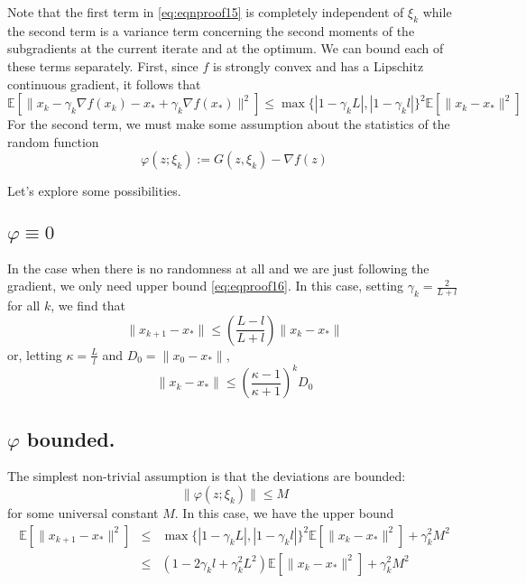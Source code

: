 Note that the first term in \eqref{eq:eqnproof15}  is completely independent of $\xi_k$ while the second term is a variance term concerning the second moments of the subgradients at the current iterate and at the optimum. We can bound each of these terms separately. First, since $f$ is strongly convex and has a Lipschitz continuous gradient, it follows that
\begin{equation} \label{eq:eqproof16}
\mathbb{E}[\| x_k-\gamma_k\nabla f(x_k)-x_*+\gamma_k \nabla f(x_*)\|^2] \leq \max\{ |1-\gamma_k L|, |1-\gamma_k l |\}^2 \mathbb{E}[\|x_k-x_*\|^2] 
\end{equation}
For the second term, we must make some assumption about the statistics of the random function
\begin{equation} \label{eq:eqproof17}
\varphi(z;\xi_k):=G(z,\xi_k)-\nabla f(z)
\end{equation}

Let's explore some possibilities.
\subsection{$\varphi\equiv 0$}
In the case when there is no randomness at all and we are just following the gradient,
we only need upper bound \eqref{eq:eqproof16}. In this case, setting $\gamma_k = \frac{2}{L+l}$ for all $k$, we find that
\begin{equation} \label{eq:eqproof18}
\|x_{k+1}-x_*\|\leq \left(\frac{L-l}{L+l}\right) \|x_k-x_*\|
\end{equation}
or, letting $\kappa=\frac{L}{l}$ and $D_0=\| x_0-x_* \|$,
\begin{equation} \label{eq:eqproof19}
\|x_{k}-x_*\|\leq \left(\frac{\kappa-1}{\kappa+1}\right)^k D_0
\end{equation}

\subsection{$\varphi$ bounded.}
The simplest non-trivial assumption is that the deviations are bounded:
\begin{equation} \label{eq:eqproof20}
\|\varphi(z;\xi_k)\|\leq M
\end{equation}
for some universal constant $M$. In this case, we have the upper bound
\begin{eqnarray} 
\mathbb{E}[\|x_{k+1}-x_*\|^2] &\leq& \max \{ |1-\gamma_k L|, |1-\gamma_k l| \}^2 \mathbb{E}[\|x_k-x_*\|^2] +\gamma_k^2 M^2 \label{eq:eqproof21}\\
&\leq& (1-2\gamma_k l+\gamma_k^2 L^2) \mathbb{E}[\|x_k-x_*\|^2]+\gamma_k^2 M^2 \label{eq:eqproof22}
\end{eqnarray}

